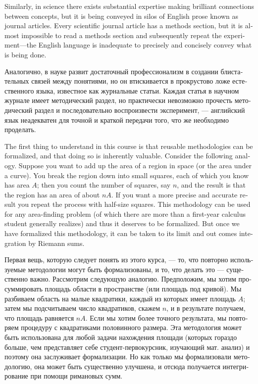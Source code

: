\documentclass{book}
\theoremstyle{theoremENG}
\theoremstyle{lemmaENG}
\theoremstyle{propositionENG}
\theoremstyle{corollaryENG}
\theoremstyle{factENG}
\theoremstyle{remarkENG}
\theoremstyle{exampleENG}
\theoremstyle{warningENG}
\theoremstyle{questionENG}
\theoremstyle{guessENG}
\theoremstyle{answerENG}
\theoremstyle{constructionENG}
\theoremstyle{rulesENG}
\theoremstyle{excENG}
\theoremstyle{appENG}
\theoremstyle{definitionENG}
\theoremstyle{notationENG}
\theoremstyle{conjectureENG}
\theoremstyle{postulateENG}
\theoremstyle{theoremRUS}
\theoremstyle{lemmaRUS}
\theoremstyle{propositionRUS}
\theoremstyle{corollaryRUS}
\theoremstyle{factRUS}
\theoremstyle{remarkRUS}
\theoremstyle{exampleRUS}
\theoremstyle{warningRUS}
\theoremstyle{questionRUS}
\theoremstyle{guessRUS}
\theoremstyle{answerRUS}
\theoremstyle{constructionRUS}
\theoremstyle{rulesRUS}
\theoremstyle{excRUS}
\theoremstyle{appRUS}
\theoremstyle{definitionRUS}
\theoremstyle{notationRUS}
\theoremstyle{conjectureRUS}
\theoremstyle{postulateRUS}
\begin{document}
\begin{english}
Similarly, in science there exists substantial expertise making brilliant connections between concepts, but it is being conveyed in silos of English prose known as journal articles. Every scientific journal article has a methods section, but it is almost impossible to read a methods section and subsequently repeat the experiment---the English language is inadequate to precisely and concisely convey what is being done.

\begin{russian}Аналогично, в науке развит достаточный профессионализм в создании блистательных связей между понятиями, но он втискивается в прокрустово ложе естественного языка, известное как журнальные статьи. Каждая статья в научном журнале имеет методический раздел, но практически невозможно прочесть методический раздел и последовательно воспроизвести эксперимент, — английский язык неадекватен для точной и краткой передачи того, что же необходимо проделать. \end{russian}

The first thing to understand in this course is that reusable methodologies can be formalized, and that doing so is inherently valuable. Consider the following analogy. Suppose you want to add up the area of a region in space (or the area under a curve). You break the region down into small squares, each of which you know has area $A$; then you count the number of squares, say $n$, and the result is that the region has an area of about $nA$. If you want a more precise and accurate result you repeat the process with half-size squares. This methodology can be used for any area-finding problem (of which there are more than a first-year calculus student generally realizes) and thus it deserves to be formalized. But once we have formalized this methodology, it can be taken to its limit and out comes integration by Riemann sums.

\begin{russian}Первая вещь, которую следует понять из этого курса, — то, что повторно используемые методологии могут быть формализованы, и то, что делать это — существенно важно. Рассмотрим следующую аналогию. Предположим, мы хотим просуммировать площадь области в пространстве (или площадь под кривой). Мы разбиваем область на малые квадратики, каждый из которых имеет площадь $A$; затем мы подсчитываем число квадратиков, скажем $n$, и в результате получаем, что площадь равняется $nA$. Если мы хотим более точного результата, мы повторяем процедуру с квадратиками половинного размера. Эта методология может быть использована для любой задачи нахождения площади (которых гораздо больше, чем представляет себе студент-первокурсник, изучающий мат. анализ) и поэтому она заслуживает формализации. Но как только мы формализовали методологию, она может быть существенно улучшена, и отсюда получается интегрирование при помощи римановых сумм. \end{russian}


\end{english}
\end{document}
